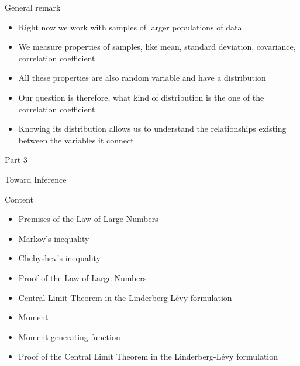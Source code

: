 \documentclass{beamer}
\begin{document}


\begin{frame}
{\centerline{General remark}}

\begin{itemize}
\item Right now we work with samples of larger populations of data
\item We measure properties of samples, like mean, standard deviation, covariance, correlation coefficient
\item All these properties are also random variable and have a distribution
\item Our question is therefore, what kind of distribution is the one of the correlation coefficient
\item Knowing its distribution allows us to understand the relationships existing between the variables it connect
\end{itemize}


\end{frame}

\begin{frame}
{\centerline{Part 3}}

\begin{center}
\Huge Toward Inference
\end{center}
\end{frame}

\begin{frame}
{\centerline{Content}}

\begin{itemize}
\item Premises of the Law of Large Numbers
\item Markov's inequality
\item Chebyshev’s inequality
\item Proof of the Law of Large Numbers
\item Central Limit Theorem in the Linderberg-L\'{e}vy formulation
\item Moment
\item Moment generating function
\item Proof of the Central Limit Theorem in the Linderberg-L\'{e}vy formulation
\end{itemize}


\end{frame}
\end{document}
